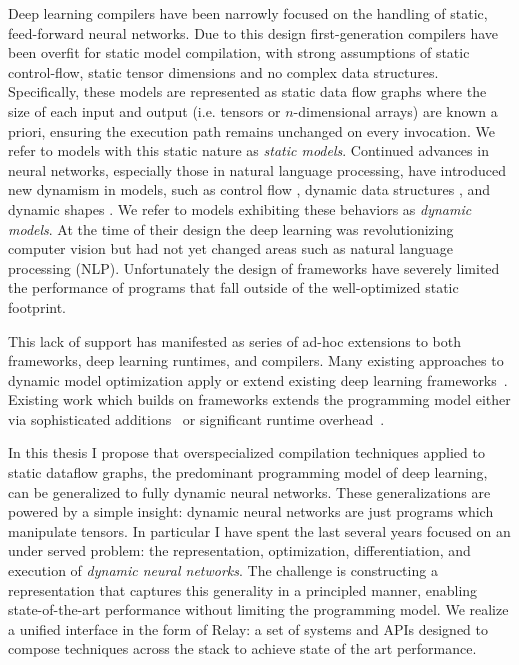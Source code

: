 Deep learning compilers have been narrowly focused
  on the handling of static, feed-forward neural networks.
Due to this design first-generation compilers have been overfit
  for static model compilation, with strong assumptions of static control-flow,
  static tensor dimensions and no complex data structures.
Specifically, these models are represented as static data flow graphs where the
  size of each input and output (i.e. tensors or $n$-dimensional arrays) are known a priori,
  ensuring the execution path remains unchanged on every invocation.
We refer to models with this static nature as \emph{static models}.
Continued advances in neural networks, especially those in natural language processing,
  have introduced new dynamism in models, such as control flow \citep{lstm, language_model},
  dynamic data structures \citep{tree_lstm, graph_lstm}, and dynamic shapes \citep{devlin2018bert}.
  We refer to models exhibiting these behaviors as {\em dynamic models}.
At the time of their design the deep learning was revolutionizing
  computer vision but had not yet changed areas such as natural language processing (NLP).
Unfortunately the design of frameworks have severely limited the performance
  of programs that fall outside of the well-optimized static footprint.

This lack of support has manifested as series of ad-hoc extensions to
  both frameworks, deep learning runtimes, and compilers.
Many existing approaches to dynamic model optimization apply or
  extend existing deep learning frameworks~\citep{xu2018cavs, gao2018low, yu2018dynamic, jeong2018improving, jeong2019janus, dynet, tf_fold}.
Existing work which builds on frameworks extends the programming model either via
  sophisticated additions~\citep{yu2018dynamic} or significant runtime overhead~\citep{tf_fold, jeong2019janus}.

In this thesis I propose that overspecialized
  compilation techniques applied to static dataflow graphs,
  the predominant programming model of deep learning,
  can be generalized to fully dynamic neural networks.
These generalizations are powered by a simple insight:
  dynamic neural networks are just programs which manipulate tensors.
In particular I have spent the last several years focused on an under served problem:
  the representation,
  optimization,
  differentiation,
  and execution of \emph{dynamic neural networks}.
The challenge is constructing a representation that captures this generality
  in a principled manner, enabling state-of-the-art performance without limiting the programming model.
We realize a unified interface in the form of Relay: a set of systems and APIs designed
  to compose techniques across the stack to achieve state of the art performance.

